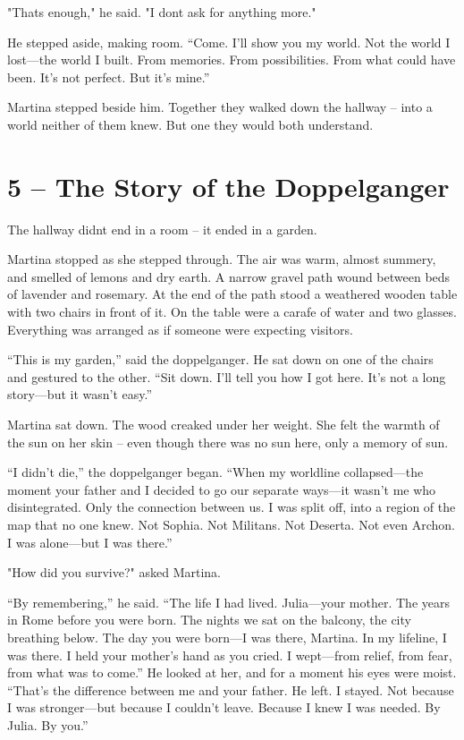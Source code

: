\documentclass[
]{article}
\begin{document}
"That\textquotesingle s enough," he said. "I don\textquotesingle t ask for anything more."

He stepped aside, making room. ``Come. I'll show you my world. Not the world I lost---the world I built. From memories. From possibilities. From what could have been. It's not perfect. But it's mine.''

Martina stepped beside him. Together they walked down the hallway -- into a world neither of them knew. But one they would both understand.

\section{5 -- The Story of the Doppelganger}\label{the-story-of-the-doppelganger}

The hallway didn\textquotesingle t end in a room -- it ended in a garden.

Martina stopped as she stepped through. The air was warm, almost summery, and smelled of lemons and dry earth. A narrow gravel path wound between beds of lavender and rosemary. At the end of the path stood a weathered wooden table with two chairs in front of it. On the table were a carafe of water and two glasses. Everything was arranged as if someone were expecting visitors.

``This is my garden,'' said the doppelganger. He sat down on one of the chairs and gestured to the other. ``Sit down. I'll tell you how I got here. It's not a long story---but it wasn't easy.''

Martina sat down. The wood creaked under her weight. She felt the warmth of the sun on her skin -- even though there was no sun here, only a memory of sun.

``I didn't die,'' the doppelganger began. ``When my worldline collapsed---the moment your father and I decided to go our separate ways---it wasn't me who disintegrated. Only the connection between us. I was split off, into a region of the map that no one knew. Not Sophia. Not Militans. Not Deserta. Not even Archon. I was alone---but I was there.''

"How did you survive?" asked Martina.

``By remembering,'' he said. ``The life I had lived. Julia---your mother. The years in Rome before you were born. The nights we sat on the balcony, the city breathing below. The day you were born---I was there, Martina. In my lifeline, I was there. I held your mother's hand as you cried. I wept---from relief, from fear, from what was to come.'' He looked at her, and for a moment his eyes were moist. ``That's the difference between me and your father. He left. I stayed. Not because I was stronger---but because I couldn't leave. Because I knew I was needed. By Julia. By you.''
\end{document}
